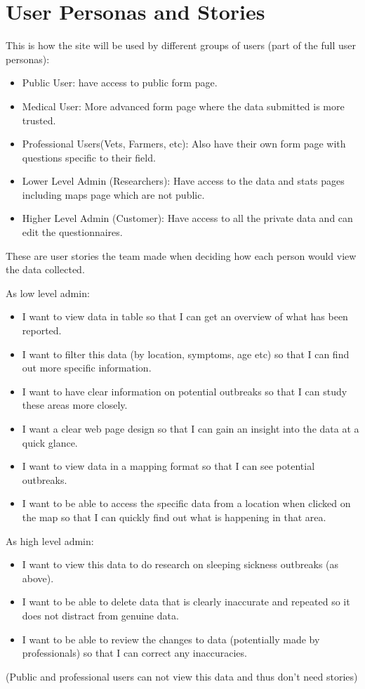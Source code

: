 \documentclass{l3proj}
\begin{document}
\section{User Personas and Stories}
\label{appendix:UPandS}
This is how the site will be used by different groups of users (part of the full user personas):
\begin{itemize}
    \item Public User: have access to public form page.
    \item Medical User: More advanced form page where the data submitted is more trusted.
    \item Professional Users(Vets, Farmers, etc): Also have their own form page with questions specific to their field.
    \item Lower Level Admin (Researchers): Have access to the data and stats pages including maps page which are not public.
    \item Higher Level Admin (Customer): Have access to all the private data and can edit the questionnaires.
\end{itemize}


These are user stories the team made when deciding how each person would view the data collected.

As low level admin:
\begin{itemize}
    \item I want to view data in table so that I can get an overview of what has been reported.
    \item I want to filter this data (by location, symptoms, age etc) so that I can find out more specific information.
    \item I want to have clear information on potential outbreaks so that I can study these areas more closely.
    \item I want a clear web page design so that I can gain an insight into the data at a quick glance.
    \item I want to view data in a mapping format so that I can see potential outbreaks.
    \item I want to be able to access the specific data from a location when clicked on the map so that I can quickly find out what is happening in that area.
\end{itemize}

As high level admin:
\begin{itemize}
    \item I want to view this data to do research on sleeping sickness outbreaks (as above).
    \item I want to be able to delete data that is clearly inaccurate and repeated so it does not distract from genuine data.
    \item I want to be able to review the changes to data (potentially made by professionals) so that I can correct any inaccuracies.
\end{itemize}

(Public and professional users can not view this data and thus don't need stories)
\end{document}
